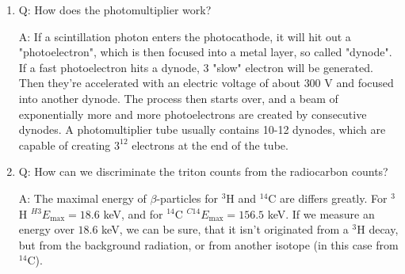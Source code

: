 \begin{enumerate}
    \item Q: How does the photomultiplier work?
    \begin{displayquote}
        A: If a scintillation photon enters the photocathode, it will hit out a "photoelectron", which is then focused into a metal layer, so called "dynode". If a fast photoelectron hits a dynode, 3 "slow" electron will be generated. Then they're accelerated with an electric voltage of about $300$ V and focused into another dynode. The process then starts over, and a beam of exponentially more and more photoelectrons are created by consecutive dynodes. A photomultiplier tube usually contains 10-12 dynodes, which are capable of creating $3^{12}$ electrons at the end of the tube.
    \end{displayquote}
    
    \item Q: How can we discriminate the triton counts from the radiocarbon counts?
    \begin{displayquote}
        A: The maximal energy of $\beta$-particles for $^{3}$H and $^{14}$C are differs greatly. For $^{3}$H $^{H3}E_{\text{max}} = 18.6$ keV, and for $^{14}$C $^{C14}E_{\text{max}} = 156.5$ keV. If we measure an energy over $18.6$ keV, we can be sure, that it isn't originated from a $^{3}$H decay, but from the background radiation, or from another isotope (in this case from $^{14}$C).
    \end{displayquote}
\end{enumerate}